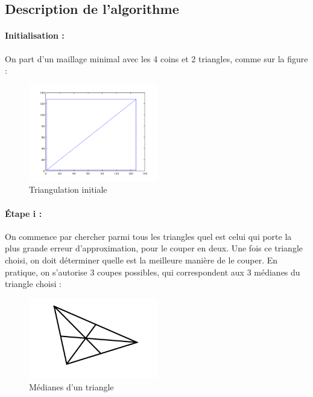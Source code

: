 \documentclass{report}
\begin{document}
\subsection{Description de l'algorithme}

\paragraph{Initialisation :}

On part d'un maillage minimal avec les 4 coins et 2 triangles, comme sur la figure :

\begin{figure}[ht]
\centering
\includegraphics[width=0.5\textwidth]{beginBissect.png}
\caption{Triangulation initiale}
\end{figure}

\clearpage

\paragraph{Étape i :}

On commence par chercher parmi tous les triangles quel est celui qui porte la plus grande erreur d'approximation, pour le couper en deux. Une fois ce triangle choisi, on doit déterminer quelle est la meilleure manière de le couper. En pratique, on s'autorise 3 coupes possibles, qui correspondent aux 3 médianes du triangle choisi :

\begin{figure}[ht]
\centering
\includegraphics[width=0.5\textwidth]{triangle.png}
\caption{Médianes d'un triangle}
\end{figure}
\end{document}
